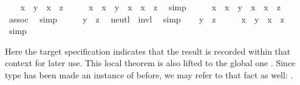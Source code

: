 \begin{isabellebody}
\isamarkupfalse%
\isanewline
\ \ \isamarkupfalse%
\ {\isachardoublequoteopen}x\ {\isasymotimes}\ y\ {\isacharequal}\ x\ {\isasymotimes}\ z{\isachardoublequoteclose}\isanewline
\ \ \isamarkupfalse%
\ \isamarkupfalse%
\ {\isachardoublequoteopen}x{\isasymdiv}\ {\isasymotimes}\ {\isacharparenleft}x\ {\isasymotimes}\ y{\isacharparenright}\ {\isacharequal}\ x{\isasymdiv}\ {\isasymotimes}\ {\isacharparenleft}x\ {\isasymotimes}\ z{\isacharparenright}{\isachardoublequoteclose}\ \isamarkupfalse%
\ simp\isanewline
\ \ \isamarkupfalse%
\ \isamarkupfalse%
\ {\isachardoublequoteopen}{\isacharparenleft}x{\isasymdiv}\ {\isasymotimes}\ x{\isacharparenright}\ {\isasymotimes}\ y\ {\isacharequal}\ {\isacharparenleft}x{\isasymdiv}\ {\isasymotimes}\ x{\isacharparenright}\ {\isasymotimes}\ z{\isachardoublequoteclose}\ \isamarkupfalse%
\ assoc\ \isamarkupfalse%
\ simp\isanewline
\ \ \isamarkupfalse%
\ \isamarkupfalse%
\ {\isachardoublequoteopen}y\ {\isacharequal}\ z{\isachardoublequoteclose}\ \isamarkupfalse%
\ neutl\ \ invl\ \isamarkupfalse%
\ simp\isanewline
{}\isamarkupfalse%
\isanewline
\ \ \isamarkupfalse%
\ {\isachardoublequoteopen}y\ {\isacharequal}\ z{\isachardoublequoteclose}\isanewline
\ \ \isamarkupfalse%
\ \isamarkupfalse%
\ {\isachardoublequoteopen}x\ {\isasymotimes}\ y\ {\isacharequal}\ x\ {\isasymotimes}\ z{\isachardoublequoteclose}\ \isamarkupfalse%
\ simp\isanewline
{}\isamarkupfalse%
%
\endisatagquote
{\isafoldquote}%
%
\isadelimquote
%
\endisadelimquote
%
\begin{isamarkuptext}%
\noindent Here the  target specification
  indicates that the result is recorded within that context for later
  use.  This local theorem is also lifted to the global one \hyperlink{fact.group.left-cancel:}{\mbox{}} .  Since type  has been made an instance of
   before, we may refer to that fact as well: .%

\end{isamarkuptext}
\end{isabellebody}
